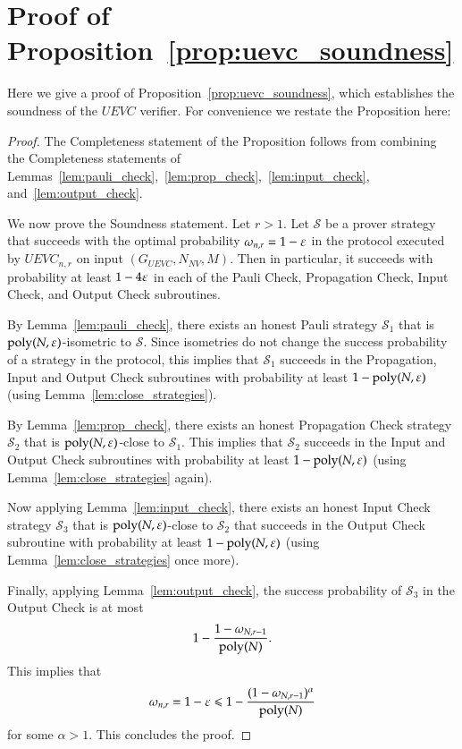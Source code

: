 \section{Proof of Proposition~\ref{prop:uevc_soundness}}
\label{sec:soundness}

Here we give a proof of Proposition~\ref{prop:uevc_soundness}, which establishes the soundness of the $UEVC$ verifier. For convenience we restate the Proposition here:

\soundness*

\begin{proof}
	
	The Completeness statement of the Proposition follows from combining the Completeness statements of Lemmas~\ref{lem:pauli_check},~\ref{lem:prop_check},~\ref{lem:input_check}, and~\ref{lem:output_check}.
	
	We now prove the Soundness statement. Let $r > 1$. Let $\mathcal{S}$ be a prover strategy that succeeds with the optimal probability $\omega_{n,r} = 1 - \varepsilon$ in the protocol executed by $UEVC_{n,r}$ on input $(G_{UEVC},N_{NV},M)$. Then in particular, it succeeds with probability at least $1 - 4\varepsilon$ in each of the Pauli Check, Propagation Check, Input Check, and Output Check subroutines. 
	
	By Lemma~\ref{lem:pauli_check}, there exists an honest Pauli strategy $\mathcal{S}_1$ that is $\operatorname{poly}(N,\varepsilon)$-isometric to $\mathcal{S}$. Since isometries do not change the success probability of a strategy in the protocol, this implies that $\mathcal{S}_1$ succeeds in the Propagation, Input and Output Check subroutines with probability at least $1 - \operatorname{poly}(N,\varepsilon)$ (using Lemma~\ref{lem:close_strategies}).
	
	By Lemma~\ref{lem:prop_check}, there exists an honest Propagation Check strategy $\mathcal{S}_2$ that is $\operatorname{poly}(N,\varepsilon)$-close to $\mathcal{S}_1$. This implies that $\mathcal{S}_2$ succeeds in the Input and Output Check subroutines with probability at least $1 - \operatorname{poly}(N,\varepsilon)$ (using Lemma~\ref{lem:close_strategies} again).
	
	Now applying Lemma~\ref{lem:input_check}, there exists an honest Input Check strategy $\mathcal{S}_3$ that is $\operatorname{poly}(N,\varepsilon)$-close to $\mathcal{S}_2$ that succeeds in the Output Check subroutine with probability at least $1 - \operatorname{poly}(N,\varepsilon)$ (using Lemma~\ref{lem:close_strategies} once more).
	
	Finally, applying Lemma~\ref{lem:output_check}, the success probability of $\mathcal{S}_3$ in the Output Check is at most 
	\[
		1 - \frac{1 - \omega_{N,r-1}}{\operatorname{poly}(N)}.
	\]
	This implies that
	\[
		\omega_{n,r} = 1 - \varepsilon \leqslant 1 - \frac{(1 - \omega_{N,r-1})^\alpha}{\operatorname{poly}(N)}
	\]
	for some $\alpha > 1$. 
	This concludes the proof.
\end{proof}